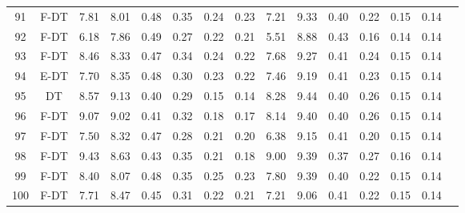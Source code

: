 \begin{longtable}{@{\hskip3pt}c@{\hskip3pt}c@{\hskip3pt}c@{\hskip3pt}c@{\hskip3pt}c@{\hskip3pt}c@{\hskip3pt}c@{\hskip3pt}c@{\hskip3pt}c@{\hskip3pt}c@{\hskip3pt}c@{\hskip3pt}c@{\hskip3pt}c@{\hskip3pt}c@{\hskip3pt}c}
         91 &           F-DT &              7.81 &        8.01 &          0.48 &        0.35 &        0.24 &         0.23 &                7.21 &        9.33 &          0.40 &        0.22 &        0.15 &         0.14 \\
         92 &           F-DT &              6.18 &        7.86 &          0.49 &        0.27 &        0.22 &         0.21 &                5.51 &        8.88 &          0.43 &        0.16 &        0.14 &         0.14 \\
         93 &           F-DT &              8.46 &        8.33 &          0.47 &        0.34 &        0.24 &         0.22 &                7.68 &        9.27 &          0.41 &        0.24 &        0.15 &         0.14 \\
         94 &           E-DT &              7.70 &        8.35 &          0.48 &        0.30 &        0.23 &         0.22 &                7.46 &        9.19 &          0.41 &        0.23 &        0.15 &         0.14 \\
         95 &             DT &              8.57 &        9.13 &          0.40 &        0.29 &        0.15 &         0.14 &                8.28 &        9.44 &          0.40 &        0.26 &        0.15 &         0.14 \\
         96 &           F-DT &              9.07 &        9.02 &          0.41 &        0.32 &        0.18 &         0.17 &                8.14 &        9.40 &          0.40 &        0.26 &        0.15 &         0.14 \\
         97 &           F-DT &              7.50 &        8.32 &          0.47 &        0.28 &        0.21 &         0.20 &                6.38 &        9.15 &          0.41 &        0.20 &        0.15 &         0.14 \\
         98 &           F-DT &              9.43 &        8.63 &          0.43 &        0.35 &        0.21 &         0.18 &                9.00 &        9.39 &          0.37 &        0.27 &        0.16 &         0.14 \\
         99 &           F-DT &              8.40 &        8.07 &          0.48 &        0.35 &        0.25 &         0.23 &                7.80 &        9.39 &          0.40 &        0.22 &        0.15 &         0.14 \\
        100 &           F-DT &              7.71 &        8.47 &          0.45 &        0.31 &        0.22 &         0.21 &                7.21 &        9.06 &          0.41 &        0.22 &        0.15 &         0.14 \\

\end{longtable}
